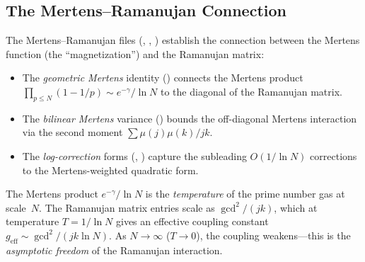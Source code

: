 \subsection{The Mertens--Ramanujan Connection}

The Mertens--Ramanujan files (,
, )
establish the connection between the Mertens function (the
``magnetization'') and the Ramanujan matrix:
\begin{itemize}
  \item The \emph{geometric Mertens} identity
    () connects the Mertens product
    $\prod_{p \leq N}(1 - 1/p) \sim e^{-\gamma}/\ln N$ to the
    diagonal of the Ramanujan matrix.
  \item The \emph{bilinear Mertens} variance
    () bounds the off-diagonal
    Mertens interaction via the second moment $\sum \mu(j)\mu(k)/jk$.
  \item The \emph{log-correction} forms
    (, )
    capture the subleading $O(1/\ln N)$ corrections to the
    Mertens-weighted quadratic form.
\end{itemize}

\begin{correspondence}
The Mertens product $e^{-\gamma}/\ln N$ is the \emph{temperature}
of the prime number gas at scale~$N$. The Ramanujan matrix entries
scale as $\gcd^2/(jk)$, which at temperature $T = 1/\ln N$ gives
an effective coupling constant $g_{\text{eff}} \sim \gcd^2/(jk\ln N)$.
As $N \to \infty$ ($T \to 0$), the coupling weakens---this is the
\emph{asymptotic freedom} of the Ramanujan interaction.
\end{correspondence}
